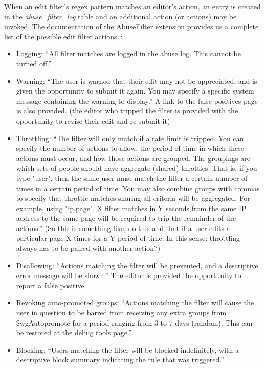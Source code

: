 When an edit filter's regex pattern matches an editor's action, an entry is created in the \emph{abuse\_filter\_log} table and an additional action (or actions) may be invoked.
The documentation of the AbuseFilter extension provides us a complete list of the possible edit filter actions~\cite{Mediawiki:AbuseFilterActions}:
\begin{itemize}
    \item Logging: ``All filter matches are logged in the abuse log. This cannot be turned off.''
    \item Warning: ``The user is warned that their edit may not be appreciated, and is given the opportunity to submit it again. You may specify a specific system message containing the warning to display.'' A link to the false positives page~\cite{Wikipedia:EditFilterFalsePositives} is also provided. (the editor who tripped the filter is provided with the opportunity to revise their edit and re-submit it)
    \item Throttling: ``The filter will only match if a rate limit is tripped. You can specify the number of actions to allow, the period of time in which these actions must occur, and how those actions are grouped.
         The groupings are which sets of people should have aggregate (shared) throttles. That is, if you type "user", then the same user must match the filter a certain number of times in a certain period of time. You may also combine groups with commas to specify that throttle matches sharing all criteria will be aggregated. For example, using "ip,page", X filter matches in Y seconds from the same IP address to the same page will be required to trip the remainder of the actions.''
         (So this is something like, do this and that if a user edits a particular page X times for a Y period of time. In this sense: throttling always has to be paired with another action?)
    \item Disallowing: ``Actions matching the filter will be prevented, and a descriptive error message will be shown.'' The editor is provided the opportunity to report a false positive
    \item Revoking auto-promoted groups: ``Actions matching the filter will cause the user in question to be barred from receiving any extra groups from \$wgAutopromote for a period ranging from 3 to 7 days (random). This can be restored at the debug tools page.''
    \item Blocking: ``Users matching the filter will be blocked indefinitely, with a descriptive block summary indicating the rule that was triggered.''

\end{itemize}
